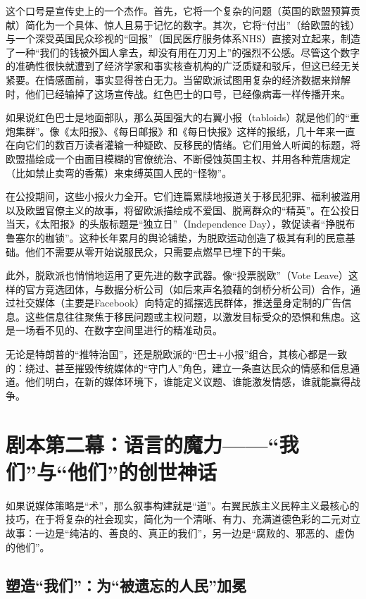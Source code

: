 这个口号是宣传史上的一个杰作。首先，它将一个复杂的问题（英国的欧盟预算贡献）简化为一个具体、惊人且易于记忆的数字。其次，它将“付出”（给欧盟的钱）与一个深受英国民众珍视的“回报”（国民医疗服务体系NHS）直接对立起来，制造了一种“我们的钱被外国人拿去，却没有用在刀刃上”的强烈不公感。尽管这个数字的准确性很快就遭到了经济学家和事实核查机构的广泛质疑和驳斥，但这已经无关紧要。在情感面前，事实显得苍白无力。当留欧派试图用复杂的经济数据来辩解时，他们已经输掉了这场宣传战。红色巴士的口号，已经像病毒一样传播开来。

如果说红色巴士是地面部队，那么英国强大的右翼小报（tabloids）就是他们的“重炮集群”。像《太阳报》、《每日邮报》和《每日快报》这样的报纸，几十年来一直在向它们的数百万读者灌输一种疑欧、反移民的情绪。它们用耸人听闻的标题，将欧盟描绘成一个由面目模糊的官僚统治、不断侵蚀英国主权、并用各种荒唐规定（比如禁止卖弯的香蕉）来束缚英国人民的“怪物”。

在公投期间，这些小报火力全开。它们连篇累牍地报道关于移民犯罪、福利被滥用以及欧盟官僚主义的故事，将留欧派描绘成不爱国、脱离群众的“精英”。在公投日当天，《太阳报》的头版标题是“独立日”（Independence Day），敦促读者“挣脱布鲁塞尔的枷锁”。这种长年累月的舆论铺垫，为脱欧运动创造了极其有利的民意基础。他们不需要从零开始说服民众，只需要点燃早已埋下的干柴。

此外，脱欧派也悄悄地运用了更先进的数字武器。像“投票脱欧”（Vote Leave）这样的官方竞选团体，与数据分析公司（如后来声名狼藉的剑桥分析公司）合作，通过社交媒体（主要是Facebook）向特定的摇摆选民群体，推送量身定制的广告信息。这些信息往往聚焦于移民问题或主权问题，以激发目标受众的恐惧和焦虑。这是一场看不见的、在数字空间里进行的精准动员。

无论是特朗普的“推特治国”，还是脱欧派的“巴士+小报”组合，其核心都是一致的：绕过、甚至摧毁传统媒体的“守门人”角色，建立一条直达民众的情感和信息通道。他们明白，在新的媒体环境下，谁能定义议题、谁能激发情感，谁就能赢得战争。

\section{剧本第二幕：语言的魔力——“我们”与“他们”的创世神话}

如果说媒体策略是“术”，那么叙事构建就是“道”。右翼民族主义民粹主义最核心的技巧，在于将复杂的社会现实，简化为一个清晰、有力、充满道德色彩的二元对立故事：一边是“纯洁的、善良的、真正的我们”，另一边是“腐败的、邪恶的、虚伪的他们”。

\subsection{塑造“我们”：为“被遗忘的人民”加冕}

